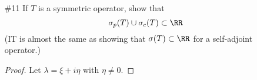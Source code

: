 \documentclass[11pt, oneside]{article}
\begin{document}
\begin{enumerate}
    \begin{proof}
      
    \end{proof}

  \pagebreak
  \item[\#11]
    If $T$ is a symmetric operator, show that
    \[
      \sigma_p(T) \cup \sigma_c(T) \subset \RR
    \]
    (IT is almost the same as showing that $\sigma(T) \subset \RR$ for a
    self-adjoint operator.)

    \begin{proof}
      Let $\lambda = \xi + i \eta$ with $\eta \neq 0$.
    \end{proof}
\end{enumerate}
\end{document}

